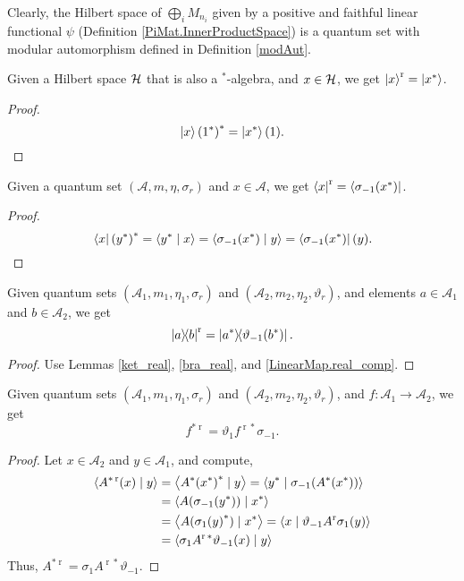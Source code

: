  Clearly, the Hilbert space of $\bigoplus_iM_{n_i}$ given by a positive and faithful linear functional $\psi$ (Definition \ref{PiMat.InnerProductSpace}) is a quantum set with modular automorphism defined in Definition \ref{modAut}.
 
 \begin{lemma}\label{ket_real}\leanok
  Given a Hilbert space $\mathcal{H}$ that is also a $^*$-algebra, and $x\in\mathcal{H}$, we get $\left\lvert x\right\rangle^{\operatorname{r}}=\left\lvert x^*\right\rangle$.
 \end{lemma}
 \begin{proof}\leanok
  \[{\left\lvert x\right\rangle(1^*)}^*=\left\lvert x^*\right\rangle(1).\]
 \end{proof}

 \begin{lemma}\label{bra_real}\leanok
  Given a quantum set $(\mathcal{A},m,\eta,\sigma_r)$ and $x\in\mathcal{A}$, we get $\left\langle x\right\rvert^{\operatorname{r}}=\left\langle\sigma_{-1}(x^*)\right\rvert$.
 \end{lemma}
 \begin{proof}\leanok
  \[{\left\langle x\right\rvert(y^*)}^*=\left\langle y^* \mid x\right\rangle=\left\langle\sigma_{-1}(x^*) \mid y\right\rangle=\left\langle\sigma_{-1}(x^*)\right\rvert(y).\]
 \end{proof}
 \begin{corollary}\label{rankOne_real}
  \leanok
  Given quantum sets $(\mathcal{A}_1,m_1,\eta_1,\sigma_r)$ and $(\mathcal{A}_2,m_2,\eta_2,\vartheta_r)$, and elements $a\in\mathcal{A}_1$ and $b\in\mathcal{A}_2$, we get
  \[\left\lvert a\right\rangle\!\!\left\langle b\right\rvert^{\operatorname{r}}=\left\lvert a^*\right\rangle\!\!\left\langle\vartheta_{-1}(b^*)\right\rvert.\]
 \end{corollary}
 \begin{proof}\leanok
  Use Lemmas \ref{ket_real}, \ref{bra_real}, and \ref{LinearMap.real_comp}.
 \end{proof}

 \begin{proposition}\label{LinearMap.adjoint_real_eq}
  \leanok
  Given quantum sets $(\mathcal{A}_1,m_1,\eta_1,\sigma_r)$ and $(\mathcal{A}_2,m_2,\eta_2,\vartheta_r)$, and $f\colon\mathcal{A}_1\to\mathcal{A}_2$, we get
  \[ f^{*\operatorname{r}}=\vartheta_1f^{\operatorname{r}*}\sigma_{-1}.\]
 \end{proposition}
 \begin{proof}\leanok
  Let $x\in{\mathcal{A}_2}$ and $y\in \mathcal{A}_1$, and compute,
  \begin{align*}
   \left\langle{A^{*\operatorname{r}}}(x) \mid y\right\rangle &= \left\langle{A^*(x^*)}^* \mid y\right\rangle =\left\langle y^* \mid \sigma_{-1}(A^*(x^*))\right\rangle\\
   &= \left\langle A(\sigma_{-1}(y^*)) \mid x^*\right\rangle\\
   &= \left\langle A({\sigma_{1}(y)}^*) \mid x^*\right\rangle
   = \left\langle x \mid \vartheta_{-1}A^{\operatorname{r}}\sigma_{1}(y)\right\rangle\\
   &= \left\langle\sigma_{1}A^{\operatorname{r}*}\vartheta_{-1}(x) \mid y\right\rangle
  \end{align*}
  Thus, $A^{*\operatorname{r}}=\sigma_{1}A^{\operatorname{r}*}\vartheta_{-1}$.
 \end{proof}

